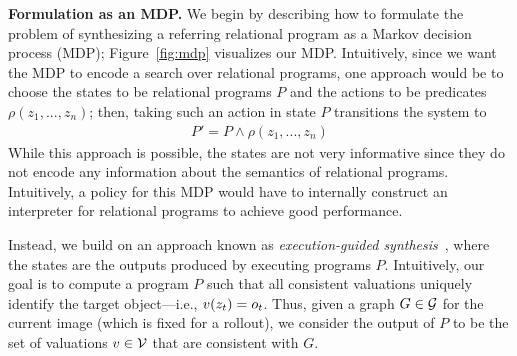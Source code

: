 \textbf{Formulation as an MDP.}
%
We begin by describing how to formulate the problem of synthesizing a referring relational program as a Markov decision process (MDP); Figure~\ref{fig:mdp} visualizes our MDP. Intuitively, since we want the MDP to encode a search over relational programs, one approach would be to choose the states to be relational programs $P$ and the actions to be predicates $\rho(z_1,...,z_n)$; then, taking such an action in state $P$ transitions the system to
\begin{align*}
P'=P\wedge\rho(z_1,...,z_n)
\end{align*}
While this approach is possible, the states are not very informative since they do not encode any information about the semantics of relational programs. Intuitively, a policy for this MDP would have to internally construct an interpreter for relational programs to achieve good performance.

Instead, we build on an approach known as \emph{execution-guided synthesis}~\cite{chen2018execution}, where the states are the outputs produced by executing programs $P$. Intuitively, our goal is to compute a program $P$ such that all consistent valuations uniquely identify the target object---i.e., $v(z_{t})=o_{t}$. Thus, given a graph $G \in \mathcal{G}$ for the current image (which is fixed for a rollout),
we consider the output of $P$ to be the set of valuations $v \in \mathcal{V}$ that are consistent with $G$.

